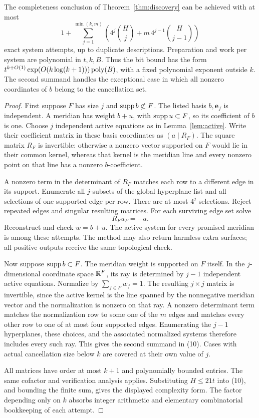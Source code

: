 \begin{theorem}
\label{thm:incidence}
The completeness conclusion of Theorem~\ref{thm:discovery} can be achieved
with at most
\[
  1+\sum_{j=1}^{\min(k,m)}
   \left(4^j\binom Hj+m\,4^{j-1}\binom H{j-1}\right)       \tag{10}\label{eq:incidence-count}
\]
exact system attempts, up to duplicate descriptions. Preparation and
work per system are polynomial in $t,k,B$. Thus the bit bound has the
form $t^{k+O(1)}\exp(O(k\log(k+1)))\operatorname{poly}(B)$, with a fixed polynomial
exponent outside $k$.
The second summand handles the exceptional case in which all nonzero
coordinates of $b$ belong to the cancellation set.
\end{theorem}
\begin{proof}
First suppose $F$ has size $j$ and $\operatorname{supp} b\not\subset F$. The listed
basis $b,\mathbf e_f$ is independent. A meridian has weight
$b+u$, with $\operatorname{supp} u\subset F$, so its coefficient of $b$ is one.
Choose $j$ independent active equations as in Lemma~\ref{lem:active}.
Write their coefficient matrix in these basis coordinates as
$(a\mid R_F)$. The square matrix $R_F$ is invertible: otherwise a
nonzero vector supported on $F$ would lie in their common kernel, whereas
that kernel is the meridian line and every nonzero point on that line
has a nonzero $b$-coefficient.

A nonzero term in the determinant of $R_F$ matches each row to a different
edge in its support. Enumerate all $j$-subsets of the global hyperplane
list and all selections of one supported edge per row. There are at most
$4^j$ selections. Reject repeated edges and singular resulting matrices.
For each surviving edge set solve
\[
                   R_F u_F=-a.                            \tag{11}\label{eq:affine-solve}
\]
Reconstruct and check $w=b+u$. The active system for every promised
meridian is among these attempts. The method may also return harmless
extra surfaces; all positive outputs receive the same topological check.

Now suppose $\operatorname{supp} b\subset F$. The meridian weight is supported on
$F$ itself. In the $j$-dimensional coordinate space $\mathbb R^F$, its ray is
determined by $j-1$ independent active equations. Normalize by
$\sum_{f\in F}w_f=1$. The resulting $j\times j$ matrix is invertible,
since the active kernel is the line spanned by the nonnegative meridian
vector and the normalization is
nonzero on that ray. A nonzero determinant term matches the normalization
row to some one of the $m$ edges and matches every other row to one of at
most four supported edges. Enumerating the $j-1$ hyperplanes, these
choices, and the associated normalized systems therefore includes every
such ray. This gives the second summand in (10). Cases with actual
cancellation size below $k$ are covered at their own value of $j$.

All matrices have order at most $k+1$ and polynomially bounded entries.
The same cofactor and verification analysis applies. Substituting
$H\le21t$ into (10), and bounding the finite sum, gives the displayed
complexity form. The factor depending only on $k$ absorbs integer
arithmetic and elementary combinatorial bookkeeping of each attempt.
\end{proof}

